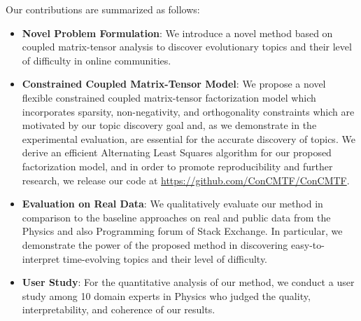 Our contributions are summarized as follows:
\begin{itemize}
\item {\bf Novel Problem Formulation}: We introduce a novel method based on coupled matrix-tensor analysis to discover evolutionary topics and their level of difficulty in online communities. 
\item {\bf Constrained Coupled Matrix-Tensor Model}: We propose a novel flexible constrained coupled matrix-tensor factorization model which incorporates sparsity, non-negativity, and orthogonality constraints which are motivated by our topic discovery goal and, as we demonstrate in the experimental evaluation, are essential for the accurate discovery of topics. We derive an efficient Alternating Least Squares algorithm for our proposed factorization model, and in order to promote reproducibility and further research, we release our code at \url{https://github.com/ConCMTF/ConCMTF}.
\item {\bf Evaluation on Real Data}: We qualitatively evaluate our method in comparison to the baseline approaches on real and public data from the Physics and also Programming forum of Stack Exchange. In particular, we demonstrate the power of the proposed method in discovering easy-to-interpret time-evolving topics and their level of difficulty. 
\item {\bf User Study}: For the quantitative analysis of our method, we conduct a user study among 10 domain experts in Physics who judged the quality, interpretability, and coherence of our results.
\end{itemize}






